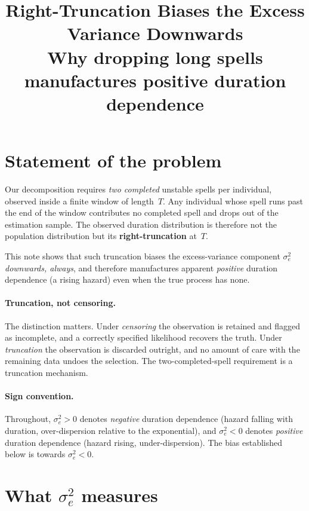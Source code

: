 \documentclass[11pt,a4paper]{article}
\title{Right-Truncation Biases the Excess Variance Downwards\\[4pt]
\large Why dropping long spells manufactures positive duration dependence}
\author{}
\date{}
\begin{document}
\maketitle

\section{Statement of the problem}

Our decomposition requires \emph{two completed} unstable spells per
individual, observed inside a finite window of length~$T$.  Any individual
whose spell runs past the end of the window contributes no completed spell
and drops out of the estimation sample.  The observed duration distribution
is therefore not the population distribution but its
\textbf{right-truncation} at~$T$.

This note shows that such truncation biases the excess-variance component
$\sigma^2_e$ \emph{downwards, always}, and therefore manufactures apparent
\emph{positive} duration dependence (a rising hazard) even when the true
process has none.

\paragraph{Truncation, not censoring.}
The distinction matters.  Under \emph{censoring} the observation is retained
and flagged as incomplete, and a correctly specified likelihood recovers the
truth.  Under \emph{truncation} the observation is discarded outright, and
no amount of care with the remaining data undoes the selection.  The
two-completed-spell requirement is a truncation mechanism.

\paragraph{Sign convention.}
Throughout, $\sigma^2_e > 0$ denotes \emph{negative} duration dependence
(hazard falling with duration, over-dispersion relative to the exponential),
and $\sigma^2_e < 0$ denotes \emph{positive} duration dependence (hazard
rising, under-dispersion).  The bias established below is towards
$\sigma^2_e < 0$.

\section{What $\sigma^2_e$ measures}
\end{document}
